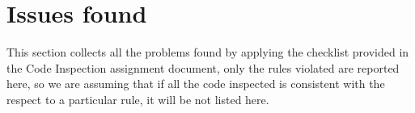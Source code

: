 \break
\section{Issues found}
This section collects all the problems found by applying the checklist provided in the Code Inspection assignment document, only the rules violated are reported here, so we are assuming that if all the code inspected is consistent with the respect to a particular rule, it will be not listed here.